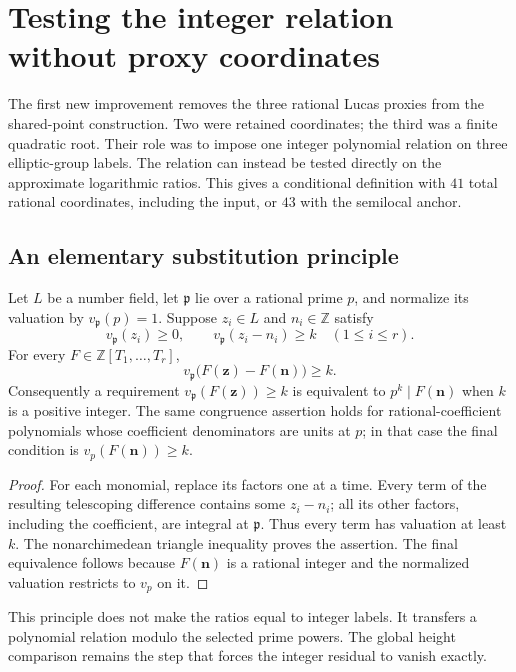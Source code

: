 \section{Testing the integer relation without proxy coordinates}
\label{sec:direct-integer-relation}

The first new improvement removes the three rational Lucas proxies
from the shared-point construction.  Two were retained coordinates;
the third was a finite quadratic root.  Their role was to impose
one integer polynomial relation on three elliptic-group labels.
The relation can instead be tested directly on the approximate
logarithmic ratios.  This gives a conditional definition with
$41$ total rational coordinates, including the input, or $43$
with the semilocal anchor.

\subsection{An elementary substitution principle}

\begin{lemma}\label{lem:direct-polynomial-congruence}
Let $L$ be a number field, let $\mathfrak p$ lie over a rational
prime $p$, and normalize its valuation by $v_{\mathfrak p}(p)=1$.
Suppose $z_i\in L$ and $n_i\in\mathbb Z$ satisfy
\[
 v_{\mathfrak p}(z_i)\ge0,
 \qquad v_{\mathfrak p}(z_i-n_i)\ge k
 \quad(1\le i\le r).
\]
For every $F\in\mathbb Z[T_1,\ldots,T_r]$,
\[
 v_{\mathfrak p}\bigl(F(\mathbf z)-F(\mathbf n)\bigr)\ge k.
\]
Consequently a requirement $v_{\mathfrak p}(F(\mathbf z))\ge k$
is equivalent to $p^k\mid F(\mathbf n)$ when $k$ is a positive
integer.  The same congruence assertion holds for rational-coefficient
polynomials whose coefficient denominators are units at $p$; in that
case the final condition is $v_p(F(\mathbf n))\ge k$.
\end{lemma}
\begin{proof}
For each monomial, replace its factors one at a time.  Every term
of the resulting telescoping difference contains some $z_i-n_i$;
all its other factors, including the coefficient, are integral at
$\mathfrak p$.  Thus every term has valuation at least $k$.
The nonarchimedean triangle inequality proves the assertion.
The final equivalence follows because $F(\mathbf n)$ is a rational
integer and the normalized valuation restricts to $v_p$ on it.
\end{proof}

This principle does not make the ratios equal to integer labels.
It transfers a polynomial relation modulo the selected prime powers.
The global height comparison remains the step that forces the
integer residual to vanish exactly.

